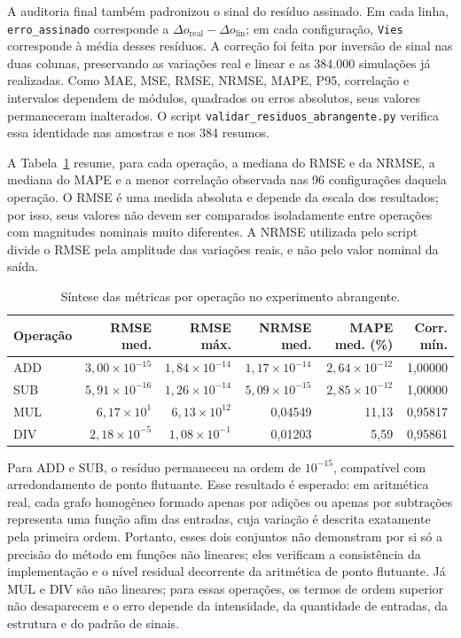 \documentclass[12pt,openright,oneside,a4paper,brazil]{abntex2}
\begin{document}
A auditoria final também padronizou o sinal do resíduo assinado. Em cada linha, \texttt{erro\_assinado} corresponde a $\Delta o_{\mathrm{real}}-\Delta o_{\mathrm{lin}}$; em cada configuração, \texttt{Vies} corresponde à média desses resíduos. A correção foi feita por inversão de sinal nas duas colunas, preservando as variações real e linear e as 384.000 simulações já realizadas. Como MAE, MSE, RMSE, NRMSE, MAPE, P95, correlação e intervalos dependem de módulos, quadrados ou erros absolutos, seus valores permaneceram inalterados. O script \texttt{validar\_residuos\_abrangente.py} verifica essa identidade nas amostras e nos 384 resumos.

A Tabela~\ref{tab:abrangente-operacoes} resume, para cada operação, a mediana do RMSE e da NRMSE, a mediana do MAPE e a menor correlação observada nas 96 configurações daquela operação. O RMSE é uma medida absoluta e depende da escala dos resultados; por isso, seus valores não devem ser comparados isoladamente entre operações com magnitudes nominais muito diferentes. A NRMSE utilizada pelo script divide o RMSE pela amplitude das variações reais, e não pelo valor nominal da saída.

\begin{table}[H]
\centering
\small
\caption{Síntese das métricas por operação no experimento abrangente.}
\label{tab:abrangente-operacoes}
\begingroup
\scriptsize
\setlength{\tabcolsep}{3pt}
\begin{tabular}{lrrrrr}
\toprule
Operação & RMSE med. & RMSE máx. & NRMSE med. & MAPE med. (\%) & Corr. mín.\\
\midrule
ADD & $3{,}00\times10^{-15}$ & $1{,}84\times10^{-14}$ & $1{,}17\times10^{-14}$ & $2{,}64\times10^{-12}$ & 1,00000\\
SUB & $5{,}91\times10^{-16}$ & $1{,}26\times10^{-14}$ & $5{,}09\times10^{-15}$ & $2{,}85\times10^{-12}$ & 1,00000\\
MUL & $6{,}17\times10^{1}$ & $6{,}13\times10^{12}$ & 0,04549 & 11,13 & 0,95817\\
DIV & $2{,}18\times10^{-5}$ & $1{,}08\times10^{-1}$ & 0,01203 & 5,59 & 0,95861\\
\bottomrule
\end{tabular}
\endgroup
{}
\end{table}

Para ADD e SUB, o resíduo permaneceu na ordem de $10^{-15}$, compatível com arredondamento de ponto flutuante. Esse resultado é esperado: em aritmética real, cada grafo homogêneo formado apenas por adições ou apenas por subtrações representa uma função afim das entradas, cuja variação é descrita exatamente pela primeira ordem. Portanto, esses dois conjuntos não demonstram por si só a precisão do método em funções não lineares; eles verificam a consistência da implementação e o nível residual decorrente da aritmética de ponto flutuante. Já MUL e DIV são não lineares; para essas operações, os termos de ordem superior não desaparecem e o erro depende da intensidade, da quantidade de entradas, da estrutura e do padrão de sinais.
\end{document}
